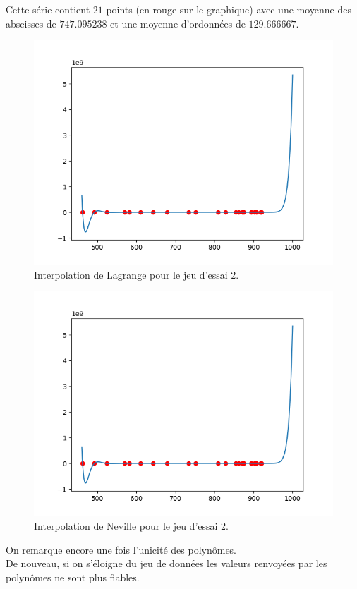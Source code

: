 \documentclass[12pt,french,titlepage]{article}
\begin{document}
		
		Cette série contient $21$ points (en rouge sur le graphique) avec une moyenne des abscisses de $747.095238$ et une moyenne d'ordonnées de $129.666667$.\\
		\begin{figure}[H]
		\includegraphics[width=\textwidth]{"21.png"}
		\caption{Interpolation de Lagrange pour le jeu d'essai 2.}
		\end{figure}
		
		\begin{figure}[H]
		\includegraphics[width=\textwidth]{"22.png"}
		\caption{Interpolation de Neville pour le jeu d'essai 2.}
		\end{figure}
	
		On remarque encore une fois l'unicité des polynômes.\\
		De nouveau, si on s'éloigne du jeu de données les valeurs renvoyées par les polynômes ne sont plus fiables.\\
		
\end{document}
